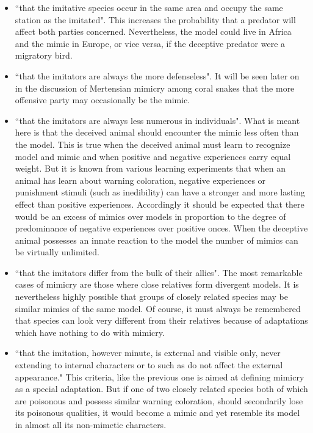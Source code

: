 \begin{itemize}
	\item ``that the imitative species occur in the same area and occupy the same station as the imitated". This increases the probability that a predator will affect both parties concerned. Nevertheless, the model could live in Africa and the mimic in Europe, or vice versa, if the deceptive predator were a migratory bird.
	\item ``that the imitators are always the more defenseless". It will be seen later on in the discussion of Mertensian mimicry among coral snakes that the more offensive party may occasionally be the mimic. 
	\item ``that the imitators are always less numerous in individuals". What is meant here is that the deceived animal should encounter the mimic less often than the model. This is true when the deceived animal must learn to recognize model and mimic and when positive and negative experiences carry equal weight. But it is known from various learning experiments that when an animal has learn about warning coloration, negative experiences or punishment stimuli (such as inedibility) can have a stronger and more lasting effect than positive experiences. Accordingly it should be expected that there would be an excess of mimics over models in proportion to the degree of predominance of negative experiences over positive onces. When the deceptive animal possesses an innate reaction to the model the number of mimics can be virtually unlimited. 
	\item ``that the imitators differ from the bulk of their allies". The most remarkable cases of mimicry are those where close relatives form divergent models. It is nevertheless highly possible that groups of closely related species may be similar mimics of the same model. Of course, it must always be remembered that species can look very different from their relatives because of adaptations which have nothing to do with mimicry. 
	\item ``that the imitation, however minute, is external and visible only, never extending to internal characters or to such as do not affect the external appearance." This criteria, like the previous one is aimed at defining mimicry as a special adaptation. But if one of two closely related species both of which are poisonous and possess similar warning coloration, should secondarily lose its poisonous qualities, it would become a mimic and yet resemble its model in almost all its non-mimetic characters.
\end{itemize}

